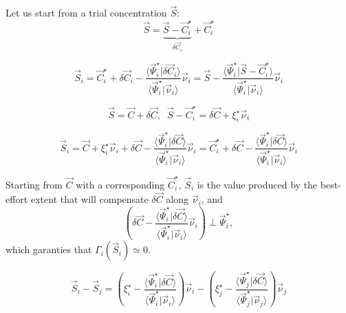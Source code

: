 \documentclass[aps,12pt]{revtex4}
\begin{document}
Let us start from a trial concentration $\vec{S}$:
\begin{equation}
	\vec{S} = \underbrace{\vec{S} - \vec{C}_i^\star}_{\delta\vec{C}_i} +  \vec{C}_i^\star
\end{equation}

\begin{equation}
	\vec{S}_i = 	\vec{C}_i^\star + \delta\vec{C}_i - \dfrac{\langle \vec{\Psi}_i^\star \vert \delta\vec{C}_i \rangle}{\langle \vec{\Psi}_i^\star \vert \vec{\nu}_i \rangle
} \vec{\nu}_i = \vec{S} - 
\dfrac{\langle \vec{\Psi}_i^\star \vert \vec{S} - \vec{C}_i^\star \rangle}{\langle \vec{\Psi}_i^\star \vert \vec{\nu}_i \rangle} \vec{\nu}_i
\end{equation}

\begin{equation}
	\vec{S} = \vec{C} + \delta\vec{C}, \;\; \vec{S}-\vec{C}_i^\star = \delta\vec{C} + \xi_i^\star \vec{\nu}_i
\end{equation}

\begin{equation}
	\vec{S}_i = \vec{C} + \xi_i^\star \vec{\nu}_i + \delta\vec{C} -  \dfrac{\langle \vec{\Psi}_i^\star \vert \delta\vec{C} \rangle}{\langle \vec{\Psi}_i^\star \vert \vec{\nu}_i \rangle} \vec{\nu}_i
	= \vec{C}_i^\star + \delta\vec{C} -  \dfrac{\langle \vec{\Psi}_i^\star \vert \delta\vec{C} \rangle}{\langle \vec{\Psi}_i^\star \vert \vec{\nu}_i \rangle} \vec{\nu}_i
\end{equation}

Starting from $\vec{C}$ with a corresponding $\vec{C}_i^\star$, $\vec{S}_i$ is the value produced by the best-effort extent that will compensate
$\delta\vec{C}$ along $\vec{\nu}_i$, and
\begin{equation}
	\left(\delta\vec{C} -  \dfrac{\langle \vec{\Psi}_i^\star \vert \delta\vec{C} \rangle}{\langle \vec{\Psi}_i^\star \vert \vec{\nu}_i \rangle} \vec{\nu}_i\right) \perp \vec{\Psi}_i^\star,
\end{equation}
which garanties that $\Gamma_i(\vec{S}_i)\simeq 0$.


\begin{equation}
	\vec{S}_i - \vec{S}_j = 
	\left( \xi_i^\star - \dfrac{\langle \vec{\Psi}_i^\star \vert \delta\vec{C} \rangle}{\langle \vec{\Psi}_i^\star \vert \vec{\nu}_i \rangle} \right) \vec{\nu}_i 
	- \left(\xi_j^\star - \dfrac{\langle \vec{\Psi}_j^\star \vert \delta\vec{C} \rangle}{\langle \vec{\Psi}_j^\star \vert \vec{\nu}_j \rangle} \right) \vec{\nu}_j 
\end{equation}
\end{document}
